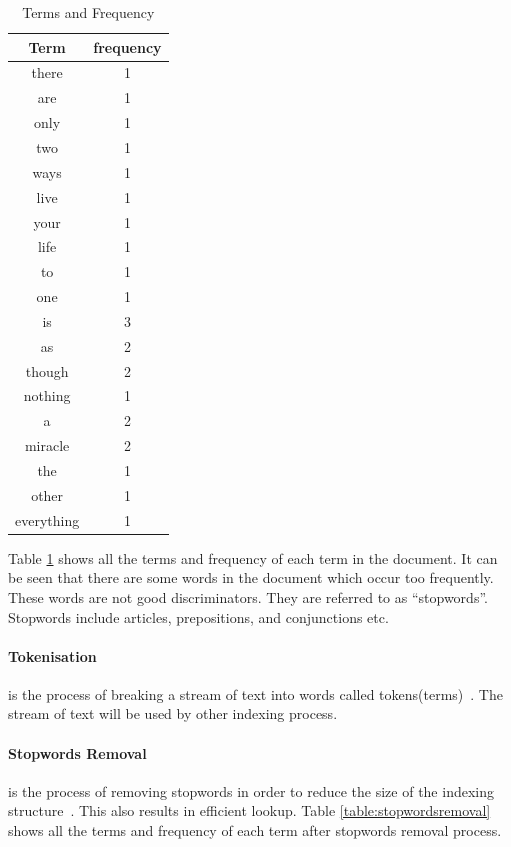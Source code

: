 \begin{table}
\centering
\begin{tabular}{|c|c|}

\hline \textbf{Term} & \textbf{frequency} \\
\hline there & 1 \\
\hline are & 1 \\
\hline only & 1 \\ 
\hline two & 1 \\
\hline ways & 1 \\
\hline live & 1 \\
\hline your & 1 \\
\hline life & 1 \\
\hline to & 1 \\
\hline one & 1 \\
\hline is & 3 \\
\hline as & 2 \\
\hline though & 2 \\
\hline nothing & 1 \\
\hline a & 2 \\
\hline miracle & 2 \\
\hline the & 1 \\
\hline other & 1 \\
\hline everything & 1 \\  
\hline
\end{tabular}
\caption{Terms and Frequency} \label{table:termsandfrequency}
\end{table}

Table \ref{table:termsandfrequency} shows all the terms and frequency of each term in the document. It can be seen that there are some words in the 
document which occur too frequently. These words are not good discriminators. They are referred to as ``stopwords''. Stopwords include
articles, prepositions, and conjunctions etc.

\paragraph{Tokenisation}
is the process of breaking a stream of text into words called tokens(terms)~\cite{tokenization}. The stream of text will be used by other indexing process.

\paragraph{Stopwords Removal}
is the process of removing stopwords in order to reduce the size of the indexing structure~\cite[P. 15]{IRarchitecture}. This also results in efficient lookup.
Table \ref{table:stopwordsremoval} shows all the terms and frequency of each term after stopwords removal process.

